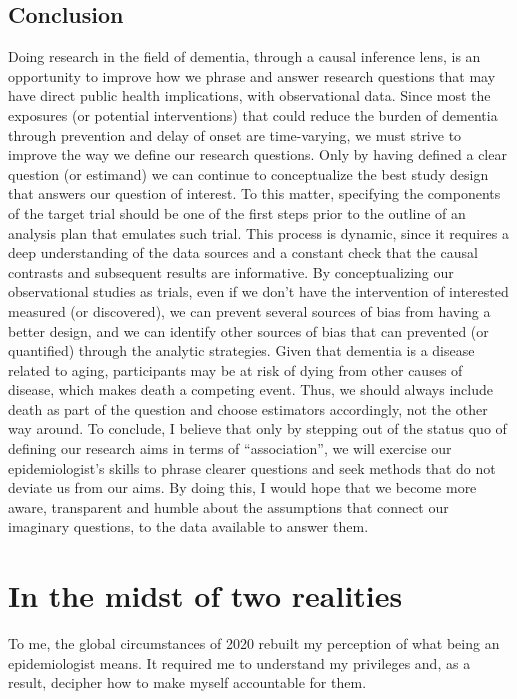\documentclass[
]{book}
\begin{document}
\hypertarget{conclusion}{%
\section{Conclusion}\label{conclusion}}

Doing research in the field of dementia, through a causal inference lens, is an opportunity to improve how we phrase and answer research questions that may have direct public health implications, with observational data. Since most the exposures (or potential interventions) that could reduce the burden of dementia through prevention and delay of onset are time-varying, we must strive to improve the way we define our research questions. Only by having defined a clear question (or estimand) we can continue to conceptualize the best study design that answers our question of interest. To this matter, specifying the components of the target trial should be one of the first steps prior to the outline of an analysis plan that emulates such trial. This process is dynamic, since it requires a deep understanding of the data sources and a constant check that the causal contrasts and subsequent results are informative. By conceptualizing our observational studies as trials, even if we don't have the intervention of interested measured (or discovered), we can prevent several sources of bias from having a better design, and we can identify other sources of bias that can prevented (or quantified) through the analytic strategies. Given that dementia is a disease related to aging, participants may be at risk of dying from other causes of disease, which makes death a competing event. Thus, we should always include death as part of the question and choose estimators accordingly, not the other way around. To conclude, I believe that only by stepping out of the status quo of defining our research aims in terms of ``association'', we will exercise our epidemiologist's skills to phrase clearer questions and seek methods that do not deviate us from our aims. By doing this, I would hope that we become more aware, transparent and humble about the assumptions that connect our imaginary questions, to the data available to answer them.

\hypertarget{chapter8}{%
\chapter{In the midst of two realities}\label{chapter8}}

To me, the global circumstances of 2020 rebuilt my perception of what being an epidemiologist means. It required me to understand my privileges and, as a result, decipher how to make myself accountable for them.
\end{document}
